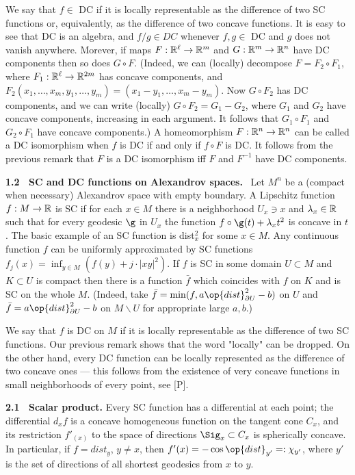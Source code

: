 We say that $f\in$ DC if it is locally representable as the difference of two SC
functions or, equivalently, as the difference of two concave functions. It
is easy
to see that DC is an algebra, and $f/g\in DC$ whenever $f,g\in$ DC and $g$
does not
vanish anywhere. Morever, if maps $F:\Bbb R^\ell\to\Bbb R^m$ and $G:\Bbb
R^m\to\Bbb
R^n$ have DC components then so does $G\circ F$. (Indeed, we can (locally)
decompose $F=F_2\circ F_1$, where $F_1:\Bbb R^\ell\to\Bbb R^{2m}$ has
concave components, and $F_2(x_1,\dots ,x_m,y_1,\dots ,y_m)=(x_1-y_1,\dots ,
x_m-y_m)$. Now $G\circ F_2$ has DC components, and we can write (locally)
$G\circ F_2=G_1-G_2$, where $G_1$ and $G_2$ have concave components,
increasing in each
argument. It follows that $G_1\circ F_1$ and $G_2\circ F_1$ have concave
components.)
A homeomorphism $F:\Bbb R^n\to\Bbb R^n$ can be called a DC isomorphism when
$f$ is
DC if and only if $f\circ F$ is DC. It follows from the previous remark
that $F$ is
a DC isomorphism iff $F$ and $F^{-1}$ have DC components.

\bigskip
{\bf 1.2 \ SC and DC functions on Alexandrov spaces.} \ Let $M^n$ be a (compact
when necessary) Alexandrov space with empty boundary.  A Lipschitz function
$f:M\to\Bbb R$ is SC if for each $x\in M$ there is a neighborhood
$U_x\ni x$ and $\lambda_x\in\Bbb R$ such that for every geodesic $\g$ in
$U_x$ the
function $f\circ\g(t)+\lambda_x t^2$ is concave in $t$. The basic example
of an SC
function is dist${}^2_x$ for some $x\in M$. Any continuous function $f$ can be
uniformly approximated by SC functions $f_j(x)=\inf_{y\in M} (f(y)+j\cdot
|xy|^2)$. If $f$ is SC in some domain $U\subset M$ and $K\subset U$ is
compact then
there is a function $\bar f$ which coincides with $f$ on $K$ and is SC on the whole
$M$. (Indeed, take $\bar f=\min(f,a{\op{dist}}^2_{\partial U}-b)$ on $U$
and $\bar f=a{\op{dist}}^2_{\partial U}-b$ on $M\backslash U$ for
appropriate large
$a,b$.)

We say that $f$ is DC on $M$ if it is locally representable as the
difference of two
SC functions. Our previous remark shows that the word "locally" can be dropped.
On the other hand, every DC function can be locally represented as the
difference of
two concave ones --- this follows from the existence of very concave
functions in
small neighborhoods of every point, see [P].

\bigskip
{}
\endspecialhead

{\bf 2.1 \ Scalar product.} Every SC function has a differential at each point;
the differential $d_xf$ is a concave homogeneous function on the tangent
cone $C_x$,
and its restriction $f'_{(x)}$ to the space of directions $\Sig_x\subset C_x$ is
spherically concave. In particular, if $f=dist_y$, $y\neq x$, then
$f'{(x)}=-\cos{\op{dist}}_{y'}=: \chi_{y'}$, where $y'$ is the set of
directions of all
shortest geodesics from $x$ to $y$.

